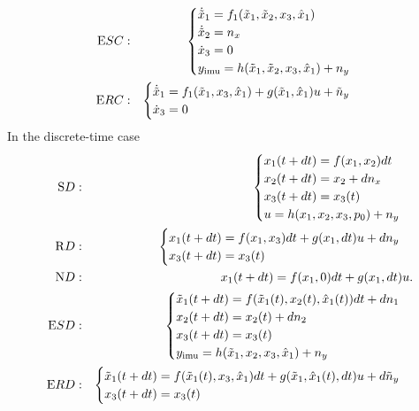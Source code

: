 {\begin{eqnarray}
{\mathrm ESC:} && \begin{cases} \dot{\tilde x}_1 = f_1(\tilde x_1, \tilde x_2, x_3, \hat x_1) \\
\dot{\tilde x}_2 = n_x \\
\dot x_3 = 0 \\
y_\mathrm{imu}  = h(\tilde x_1, \tilde x_2, x_3, \hat x_1) + n_y \end{cases}
\nonumber\\
{\mathrm ERC:} && \begin{cases} \dot{\tilde x}_1 = f_1(\tilde x_1, x_3, \hat x_1) + g(\tilde x_1, \hat x_1) u + \tilde n_y \\
\dot x_3 = 0
 \end{cases}
\nonumber
\end{eqnarray}
In the discrete-time case
\begin{eqnarray}
{\mathrm SD:} && 
\begin{cases}
x_1(t+dt) = f(x_1,x_2)dt \\
x_2(t+dt) = x_2 + dn_x \\
x_3(t+dt)= x_3(t) \\
u = h(x_1, x_2, x_3, p_0) + n_y
\end{cases}\nonumber\\
{\mathrm RD:} && 
\begin{cases}
x_1(t+dt) = f(x_1, x_3)dt + g(x_1,dt)u + dn_y \\
x_3(t+dt) = x_3(t)
\end{cases}\nonumber\\
{\mathrm ND:} && %
x_1(t+dt) = f(x_1, 0)dt + g(x_1,dt) u.
\nonumber\\
{\mathrm ESD:} && \begin{cases} \tilde x_1(t+dt) = f(\tilde x_1(t), x_2(t), \hat x_1(t)) dt + dn_1 \\
x_2(t+dt) = x_2(t) + dn_2 \\
x_3(t+dt) = x_3(t) \\
 y\imu  = h(\tilde x_1, x_2, x_3, \hat x_1) + n_y \end{cases}\nonumber\\
{\mathrm ERD:} && \begin{cases} \tilde x_1(t+dt) = f(\tilde x_1(t), x_3,\hat x_1)dt + g(\tilde x_1, \hat x_1(t),dt)u + d \tilde n_y \\
x_3(t+dt) =  x_3(t)
\end{cases}\nonumber
\end{eqnarray}
}
